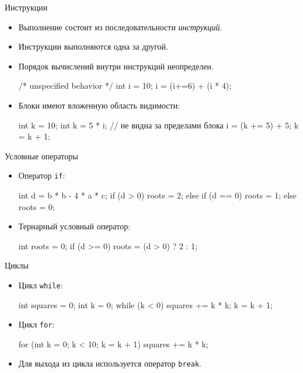 \documentclass[9pt]{beamer}
\begin{document}
\begin{frame}[fragile]{Инструкции}
    \begin{itemize}
        \item Выполнение состоит из последовательности \emph{инструкций}.
        \item Инструкции выполняются одна за другой.
        \item Порядок вычислений внутри инструкций неопределен.
        \begin{cppcode}
            /* unspecified behavior */
            int i = 10;
            i = (i+=6) + (i * 4);
        \end{cppcode}
        \item Блоки имеют вложенную область видимости:
        \begin{cppcode}
            int k = 10;
            {
                int k = 5 * i; // не видна за пределами блока
                i = (k += 5) + 5;
            }
            k = k + 1;
        \end{cppcode}
    \end{itemize}    
\end{frame}

\begin{frame}[fragile]{Условные операторы}
    \begin{itemize}
        \item Оператор \texttt{if}:
        \begin{cppcode}
            int d = b * b - 4 * a * c;
            if (d > 0)
            {
                roots = 2;
            }
            else if (d == 0)
            {
                roots = 1;
            }
            else
            {
                roots = 0;
            }
        \end{cppcode}
        \item Тернарный условный оператор:
        \begin{cppcode}
            int roots = 0;
            if (d >= 0)
                roots = (d > 0) ? 2 : 1;
        \end{cppcode}
    \end{itemize}
\end{frame}

\begin{frame}[fragile]{Циклы}
    \begin{itemize}
        \item Цикл \texttt{while}:
        \begin{cppcode}
            int squares = 0;
            int k = 0;
            while (k < 0)
            {
                squares += k * k;
                k = k + 1;
            }
        \end{cppcode}
        \item Цикл \texttt{for}:
        \begin{cppcode}
            for (int k = 0; k < 10; k = k + 1)
            {
                squares += k * k;
            }
        \end{cppcode}
        \item Для выхода из цикла используется оператор \texttt{break}.
    \end{itemize}
\end{frame}
\end{document}

